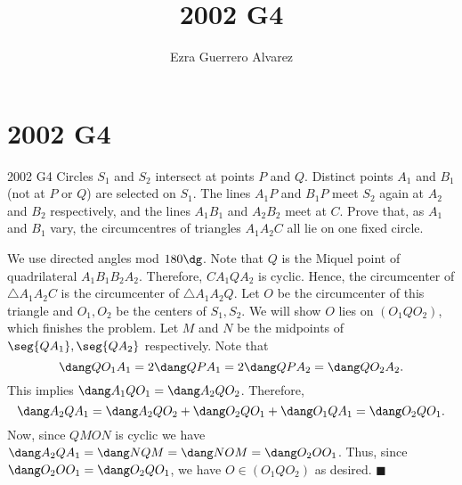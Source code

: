 \documentclass[14pt]{article}
\title{2002 G4}
\author{Ezra Guerrero Alvarez}
\begin{document}
\maketitle
	
\section*{2002 G4}

\begin{statement}{2002 G4}
	Circles $S_1$ and $S_2$ intersect at points $P$ and $Q$. Distinct points $A_1$ and $B_1$ (not at $P$ or $Q$) are selected on $S_1$. The lines $A_1P$ and $B_1P$ meet $S_2$ again at $A_2$ and $B_2$ respectively, and the lines $A_1B_1$ and $A_2B_2$ meet at $C$.  Prove that, as $A_1$ and $B_1$ vary, the circumcentres of triangles $A_1A_2C$ all lie on one fixed circle.
\end{statement}
We use directed angles mod $180\dg$. Note that $Q$ is the Miquel point of quadrilateral $A_1B_1B_2A_2$. Therefore, $CA_1QA_2$ is cyclic. Hence, the circumcenter of $\triangle A_1A_2C$ is the circumcenter of $\triangle A_1A_2Q$. Let $O$ be the circumcenter of this triangle and $O_1,O_2$ be the centers of $S_1,S_2$. We will show $O$ lies on $(O_1QO_2)$, which finishes the problem. Let $M$ and $N$ be the midpoints of $\seg{QA_1},\seg{QA_2}$ respectively. Note that
\[ \dang QO_1A_1 = 2\dang QPA_1 = 2\dang QPA_2 = \dang QO_2A_2. \]
This implies $\dang A_1QO_1 = \dang A_2QO_2$. Therefore,
\[ \dang A_2QA_1 = \dang A_2QO_2+\dang O_2QO_1+\dang O_1QA_1 = \dang O_2QO_1. \]
Now, since $QMON$ is cyclic we have $\dang A_2QA_1=\dang NQM=\dang NOM=\dang O_2OO_1$. Thus, since $\dang O_2OO_1=\dang O_2QO_1$, we have $O\in(O_1QO_2)$ as desired. $\blacksquare$
	
\end{document}
